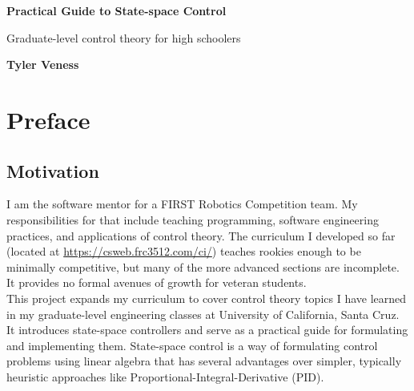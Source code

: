 \documentclass[10pt,conference,compsoc]{IEEEtran}
\begin{document}


\begin{titlepage}
  \begin{center}
    \vspace*{1cm}

    \Huge
    \textbf{Practical Guide to State-space Control}

    \vspace{0.5cm}
    \LARGE
    Graduate-level control theory for high schoolers

    \vspace{1.5cm}

    \textbf{Tyler Veness}

    \vfill

    \vspace{0.8cm}

  \end{center}

  \vfill


  \vspace{0.8cm}
\end{titlepage}
\thispagestyle{empty}  %

\tableofcontents
\listoffigures
\listoftables
\clearpage


\section{Preface}

\subsection{Motivation}

\noindent I am the software mentor for a FIRST Robotics Competition team. My
responsibilities for that include teaching programming, software engineering
practices, and applications of control theory. The curriculum I developed so far
(located at \url{https://csweb.frc3512.com/ci/}) teaches rookies enough to be
minimally competitive, but many of the more advanced sections are incomplete. It
provides no formal avenues of growth for veteran students. \\

\noindent This project expands my curriculum to cover control theory topics I
have learned in my graduate-level engineering classes at University of
California, Santa Cruz. It introduces state-space controllers and serve as a
practical guide for formulating and implementing them. State-space control is a
way of formulating control problems using linear algebra that has several
advantages over simpler, typically heuristic approaches like
Proportional-Integral-Derivative (PID). \\
\end{document}
